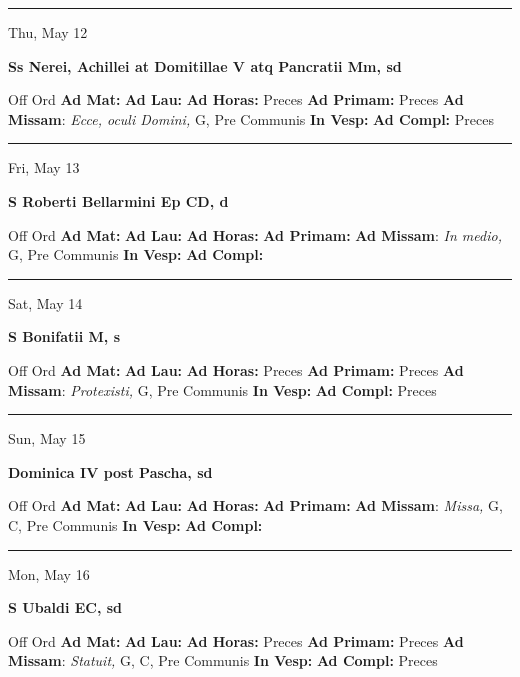 \documentclass[letterpaper, 10pt]{article}
\begin{document}
\hrule
\begin{center}
Thu, May 12
\end{center}\textbf{ \large Ss Nerei, Achillei at Domitillae V atq Pancratii Mm, \textnormal{\normalsize sd}}
\begin{justify}
Off Ord
\textbf{Ad Mat: }
\textbf{Ad Lau: }
\textbf{Ad Horas: }Preces
\textbf{Ad Primam: }Preces
\textbf{Ad Missam}: \textit{Ecce, oculi Domini,} G, Pre Communis
\textbf{In Vesp: }
\textbf{Ad Compl: }Preces\end{justify}



\hrule
\begin{center}
Fri, May 13
\end{center}\textbf{ \large S Roberti Bellarmini Ep CD, \textnormal{\normalsize d}}
\begin{justify}
Off Ord
\textbf{Ad Mat: }
\textbf{Ad Lau: }
\textbf{Ad Horas: }
\textbf{Ad Primam: }
\textbf{Ad Missam}: \textit{In medio,} G, Pre Communis
\textbf{In Vesp: }
\textbf{Ad Compl: }\end{justify}



\hrule
\begin{center}
Sat, May 14
\end{center}\textbf{ \large S Bonifatii M, \textnormal{\normalsize s}}
\begin{justify}
Off Ord
\textbf{Ad Mat: }
\textbf{Ad Lau: }
\textbf{Ad Horas: }Preces
\textbf{Ad Primam: }Preces
\textbf{Ad Missam}: \textit{Protexisti,} G, Pre Communis
\textbf{In Vesp: }
\textbf{Ad Compl: }Preces\end{justify}



\hrule
\begin{center}
Sun, May 15
\end{center}\textbf{ \large Dominica IV post Pascha, \textnormal{\normalsize sd}}
\begin{justify}
Off Ord
\textbf{Ad Mat: }
\textbf{Ad Lau: }
\textbf{Ad Horas: }
\textbf{Ad Primam: }
\textbf{Ad Missam}: \textit{Missa,} G, C, Pre Communis
\textbf{In Vesp: }
\textbf{Ad Compl: }\end{justify}



\hrule
\begin{center}
Mon, May 16
\end{center}\textbf{ \large S Ubaldi EC, \textnormal{\normalsize sd}}
\begin{justify}
Off Ord
\textbf{Ad Mat: }
\textbf{Ad Lau: }
\textbf{Ad Horas: }Preces
\textbf{Ad Primam: }Preces
\textbf{Ad Missam}: \textit{Statuit,} G, C, Pre Communis
\textbf{In Vesp: }
\textbf{Ad Compl: }Preces\end{justify}
\end{document}
